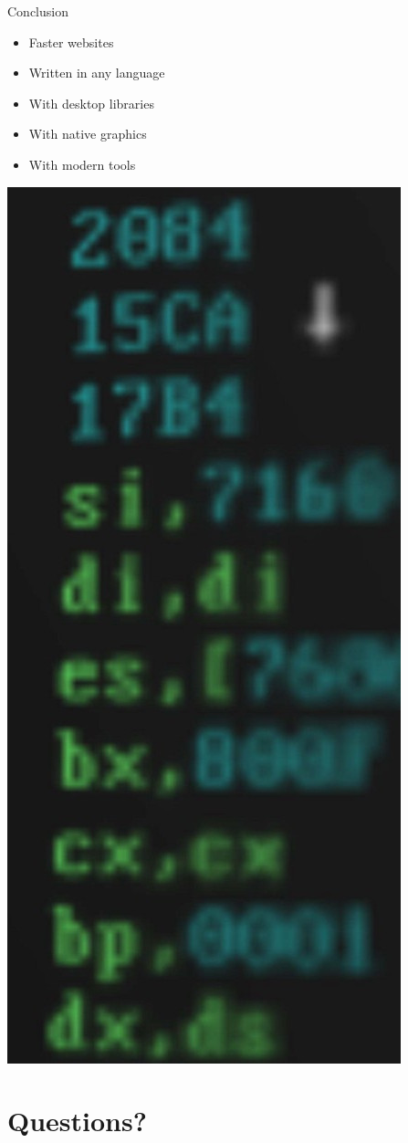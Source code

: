 \documentclass{lug}
\newcommand{\pmidg}[1]{\parbox{\widthof{#1}}{#1}}
\newcommand{\splitslide}[4]{%
    \noindent
    \begin{minipage}{#1 \textwidth - #2 }
        #3
    \end{minipage}%
    \hspace{ \dimexpr #2 * 2 \relax }%
    \begin{minipage}{\textwidth - #1 \textwidth - #2 }
        #4
    \end{minipage}
}
\begin{document}
\begin{frame}{Conclusion}
    \splitslide{0.72}{1em}{
        \begin{itemize}
            \item Faster websites
            \item Written in any language
            \item With desktop libraries
            \item With native graphics
            \item With modern tools
        \end{itemize}
    }{\pmidg{
        \includegraphics[width=\columnwidth]{graphics/mcode}
    }}
\end{frame}

\renewcommand{\secimage}{graphics/questions}
\section{Questions?}
\end{document}
